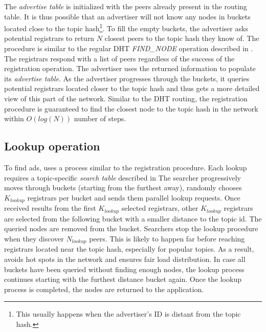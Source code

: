 The \emph{advertise table} is initialized with the peers already present in the routing table. It is thus possible that an advertiser will not know any nodes in buckets located close to the topic hash\footnote{This usually happens when the advertiser's ID is distant from the topic hash.}. 
To fill the empty buckets, the advertiser asks potential registrars to return $N$ closest peers to the topic hash they know of. 
The procedure is similar to the regular DHT \emph{FIND\_NODE} operation described in . 
The registrars respond with a list of peers regardless of the success of the registration operation. 
The advertiser uses the returned information to populate its \emph{advertise table}. 
As the advertiser progresses through the buckets, it queries potential registrars located closer to the topic hash and thus gets a more detailed view of this part of the network. 
Similar to the DHT routing, the registration procedure is guaranteed to find the closest node to the topic hash in the network within $O(log(N))$ number of steps. 

\subsection{Lookup operation}\label{sec:lookup}
To find ads, \sysname uses a process similar to the registration procedure. 
Each lookup requires a topic-specific \emph{search table} described in 
The searcher progressively moves through buckets (starting from the furthest away), randomly chooses $K_\textit{lookup}$ registrars per bucket and sends them parallel lookup requests. 
Once received results from the first $K_\textit{lookup}$ selected registrars, other $K_\textit{lookup}$ registrars are selected from the following bucket with a smaller distance to the topic id.
The queried nodes are removed from the bucket.
Searchers stop the lookup procedure when they discover $N_\textit{lookup}$ peers. This is likely to happen far before reaching registrars located near the topic hash, especially for popular topics. As a result, \sysname avoids hot spots in the network and ensures fair load distribution. 
In case all buckets have been queried without finding enough nodes, the lookup process continues starting with the furthest distance bucket again. 
Once the lookup process is completed, the nodes are returned to the application.

